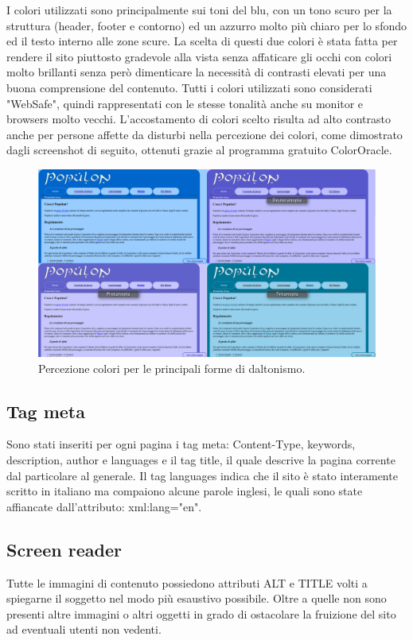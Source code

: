 \documentclass{article}
\begin{document}
I colori utilizzati sono principalmente sui toni del blu, con un tono scuro per la struttura (header, footer e contorno) ed un azzurro molto più chiaro per lo sfondo ed il testo interno alle zone scure. La scelta di questi due colori è stata fatta per rendere il sito piuttosto gradevole alla vista senza affaticare gli occhi con colori molto brillanti senza però dimenticare la necessità di contrasti elevati per una buona comprensione del contenuto.
	Tutti i colori utilizzati sono considerati "WebSafe", quindi rappresentati con le stesse tonalità anche su monitor e browsers molto vecchi.
	L'accostamento di colori scelto risulta ad alto contrasto anche per persone affette da disturbi nella percezione dei colori, come dimostrato dagli screenshot di seguito, ottenuti grazie al programma gratuito ColorOracle. \\

\newpage	
	 \begin{figure}
				\centering
				\includegraphics[scale=0.20]{all4.png}
				\caption{Percezione colori per le principali forme di daltonismo.}
			\end{figure}
			\newpage

\subsection{Tag meta}
	Sono stati inseriti per ogni pagina i tag meta: Content-Type, keywords, description, author e languages e il tag title, 
	il quale descrive la pagina corrente dal particolare al generale. 
	Il tag languages indica che il sito è stato interamente scritto in italiano ma compaiono alcune parole inglesi, 
	le quali sono state affiancate dall'attributo: xml:lang="en".

\subsection{Screen reader}
Tutte le immagini di contenuto possiedono attributi ALT e TITLE volti a spiegarne il soggetto nel modo più esaustivo possibile. Oltre a quelle non sono presenti altre immagini o altri oggetti in grado di ostacolare la fruizione del sito ad eventuali utenti non vedenti.
\end{document}
